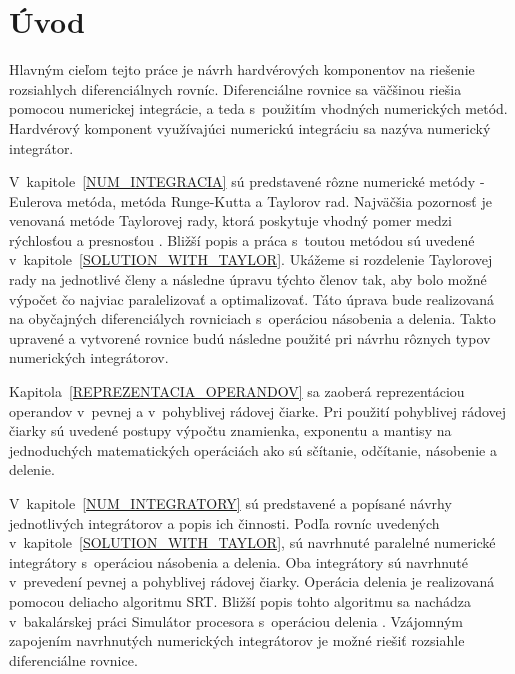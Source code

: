 


\chapter{Úvod}
Hlavným cieľom tejto práce je návrh hardvérových komponentov na riešenie rozsiahlych diferenciálnych rovníc. Diferenciálne rovnice sa väčšinou riešia pomocou numerickej integrácie, a teda s~použitím vhodných numerických metód. Hardvérový komponent využívajúci numerickú integráciu sa nazýva numerický integrátor.

V~kapitole~\ref{NUM_INTEGRACIA} sú predstavené rôzne numerické metódy - Eulerova metóda, metóda Runge-Kutta a Taylorov rad. Najväčšia pozornosť je venovaná metóde Taylorovej rady, ktorá poskytuje vhodný pomer medzi rýchlosťou a presnosťou \cite{KunovskyH}. Bližší popis a práca s~toutou metódou sú uvedené v~kapitole~\ref{SOLUTION_WITH_TAYLOR}. Ukážeme si rozdelenie Taylorovej rady na jednotlivé členy a následne úpravu týchto členov tak, aby bolo možné výpočet čo najviac paralelizovať a optimalizovať. Táto úprava bude realizovaná na obyčajných diferenciálych rovniciach s~operáciou násobenia a delenia. Takto upravené a vytvorené rovnice budú následne použité pri návrhu rôznych typov numerických integrátorov.

Kapitola~\ref{REPREZENTACIA_OPERANDOV} sa zaoberá reprezentáciou operandov v~pevnej a v~pohyblivej rádovej čiarke. Pri použití pohyblivej rádovej čiarky sú uvedené postupy výpočtu znamienka, exponentu a mantisy na jednoduchých matematických operáciách ako sú sčítanie, odčítanie, násobenie a delenie.

V~kapitole~\ref{NUM_INTEGRATORY} sú predstavené a popísané návrhy jednotlivých integrátorov a popis ich činnosti. Podľa rovníc uvedených v~kapitole~\ref{SOLUTION_WITH_TAYLOR}, sú navrhnuté paralelné numerické integrátory s~operáciou násobenia a delenia. Oba integrátory sú navrhnuté v~prevedení pevnej a pohyblivej rádovej čiarky. Operácia delenia je realizovaná pomocou deliacho algoritmu SRT. Bližší popis tohto algoritmu sa nachádza v~bakalárskej práci Simulátor procesora s~operáciou delenia \cite{MatecnyBP}.
Vzájomným zapojením navrhnutých numerických integrátorov je možné riešiť rozsiahle diferenciálne rovnice.




